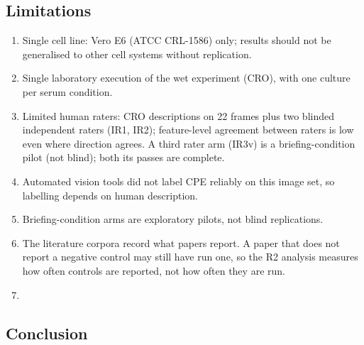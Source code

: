 \subsection*{Limitations}
\begin{enumerate}
\item Single cell line: Vero E6 (ATCC CRL-1586) only; results should not be generalised to other cell systems without replication.
\item Single laboratory execution of the wet experiment (CRO), with one culture per serum condition.
\item Limited human raters: CRO descriptions on 22 frames plus two blinded independent raters (IR1, IR2); feature-level agreement between raters is low even where direction agrees. A third rater arm (IR3v) is a briefing-condition pilot (not blind); both its passes are complete.
\item Automated vision tools did not label CPE reliably on this image set, so labelling depends on human description.
\item Briefing-condition arms are exploratory pilots, not blind replications.
\item The literature corpora record what papers report. A paper that does not report a negative control may still have run one, so the R2 analysis measures how often controls are reported, not how often they are run.
\item {}
\end{enumerate}

\subsection*{Conclusion}
